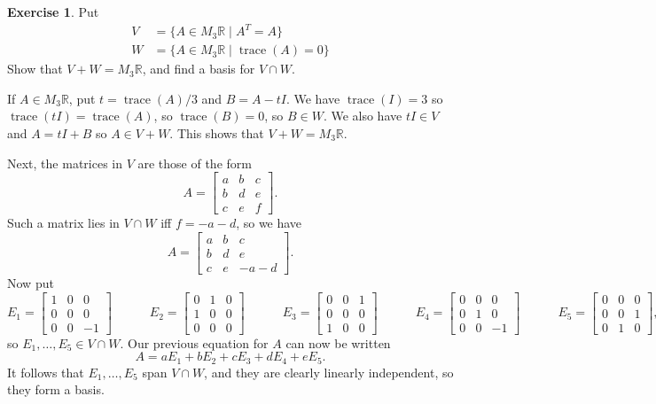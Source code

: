 \documentclass[a4paper]{amsart}
\newcommand{\R}         {{\mathbb{R}}}
\newcommand{\bpm}       {\left[\begin{matrix}}
\newcommand{\epm}       {\end{matrix}\right]}
\newcommand{\st}        {\;|\;}
\newcommand{\trace}     {\operatorname{trace}}
\renewcommand{\:}{\colon}
\theoremstyle{definition}
\newtheorem{exercise}{Exercise}
\newenvironment{solution}{{\noindent \bf Solution:}}{}
\begin{document}
\begin{exercise}
 Put 
 \begin{align*}
  V &= \{A\in M_3\R\st A^T=A\} \\
  W &= \{A\in M_3\R\st \trace(A)=0\}
 \end{align*}
 Show that $V+W=M_3\R$, and find a basis for $V\cap W$.  
\end{exercise}
\begin{solution}
 If $A\in M_3\R$, put $t=\trace(A)/3$ and $B=A-tI$.  We have
 $\trace(I)=3$ so $\trace(tI)=\trace(A)$, so $\trace(B)=0$,
 so $B\in W$.  We also have $tI\in V$ and $A=tI+B$ so
 $A\in V+W$.  This shows that $V+W=M_3\R$.

 Next, the matrices in $V$ are those of the form
 \[ A = \bpm a & b & c \\
             b & d & e \\
             c & e & f \epm.
 \]
 Such a matrix lies in $V\cap W$ iff $f=-a-d$, so we have
 \[ A = \bpm a & b & c \\
             b & d & e \\
             c & e & -a-d \epm.
 \]
 Now put
 {\tiny \[
  E_1 = \bpm 1&0&0\\0&0&0\\0&0&-1 \epm \hspace{3em}
  E_2 = \bpm 0&1&0\\1&0&0\\0&0&0 \epm \hspace{3em}
  E_3 = \bpm 0&0&1\\0&0&0\\1&0&0 \epm \hspace{3em}
  E_4 = \bpm 0&0&0\\0&1&0\\0&0&-1 \epm \hspace{3em}
  E_5 = \bpm 0&0&0\\0&0&1\\0&1&0 \epm,
 \]}
 so $E_1,\dotsc,E_5\in V\cap W$.  Our previous equation for
 $A$ can now be written 
 \[ A = aE_1 + bE_2 + cE_3 + dE_4 + eE_5. \]
 It follows that $E_1,\dotsc,E_5$ span $V\cap W$, and they
 are clearly linearly independent, so they form a basis. 
\end{solution}

\end{document}
